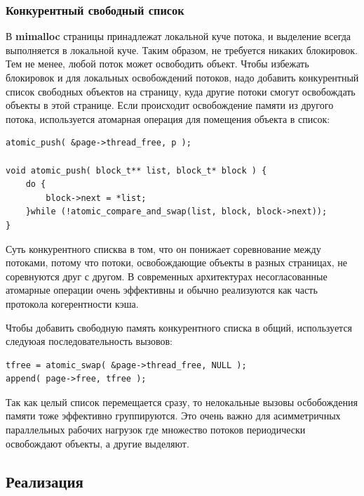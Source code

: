 \subsubsection{Конкурентный свободный список}

В \textbf{mimalloc} страницы принадлежат локальной куче потока, и выделение всегда выполняется в локальной куче. Таким образом, не требуется никаких блокировок. Тем не менее, любой поток может освободить объект. Чтобы избежать блокировок и для локальных освобождений потоков, надо добавить конкурентный список свободных объектов на страницу, куда другие потоки смогут освобождать объекты в этой странице. Если происходит освобождение памяти из другого потока, используется атомарная операция для помещения объекта в список:

\begin{lstlisting}
atomic_push( &page->thread_free, p );

void atomic_push( block_t** list, block_t* block ) {
	do {
		block->next = *list;
	}while (!atomic_compare_and_swap(list, block, block->next));
}
\end{lstlisting}

Суть конкурентного списква в том, что он понижает соревнование между потоками, потому что потоки, освобождающие объекты в разных страницах, не соревнуются друг с другом. В современных архитектурах несогласованные атомарные операции очень эффективны и обычно реализуются как часть протокола когерентности кэша.

Чтобы добавить свободную память конкурентного списка в общий, используется следуюая последовательность вызовов:
\begin{lstlisting}
tfree = atomic_swap( &page->thread_free, NULL );
append( page->free, tfree );
\end{lstlisting}

Так как целый список перемещается сразу, то нелокальные вызовы осбобождения памяти тоже эффективно группируются. Это очень важно для асимметричных параллельных рабочих нагрузок где множество потоков периодически освобождают объекты, а другие выделяют.

\subsection{Реализация}

